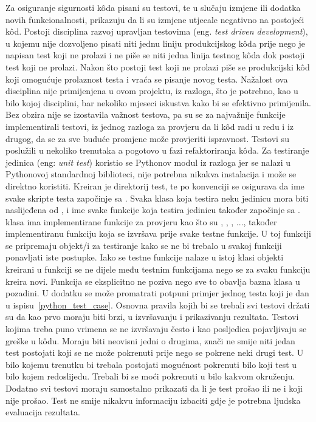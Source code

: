 Za osiguranje sigurnosti k\^oda pisani su testovi, te u slučaju izmjene ili dodatka novih funkcionalnosti, prikazuju da li su izmjene utjecale negativno na postojeći k\^od. Postoji disciplina razvoj upravljan testovima (eng. \textit{test driven development}), u kojemu nije dozvoljeno pisati niti jednu liniju produkcijskog k\^oda prije nego je napisan test koji ne prolazi i ne piše se niti jedna linija testnog k\^oda dok postoji test koji ne prolazi. Nakon što postoji test koji ne prolazi piše se produkcijski k\^od koji omogućuje prolaznost testa i vraća se pisanje novog testa. Nažalost ova disciplina nije primijenjena u ovom projektu, iz razloga, što je potrebno, kao u bilo kojoj disciplini, bar nekoliko mjeseci iskustva kako bi se efektivno primijenila. Bez obzira nije se izostavila važnost testova, pa su se za najvažnije funkcije implementirali testovi, iz jednog razloga za provjeru da li k\^od radi u redu i iz drugog, da se za sve buduće promjene može provjeriti ispravnost. Testovi su poslužili u nekoliko trenutaka a pogotovo u fazi refaktoriranja k\^oda. Za testiranje jedinica (eng: \textit{unit test}) koristio se Pythonov modul  iz razloga jer se nalazi u Pythonovoj standardnoj biblioteci, nije potrebna nikakva instalacija i može se direktno koristiti. Kreiran je direktorij test, te po konvenciji se osigurava da ime svake skripte testa započinje sa . Svaka klasa koja testira neku jedinicu mora biti naslijeđena od , i ime svake funkcije koja testira jedinicu također započinje sa .  klasa ima implementirane funkcije za provjeru kao što su , , , ..., također implementiranu funkciju  koja se izvršava prije svake testne funkcije. U toj funkciji se pripremaju objekt/i za testiranje kako se ne bi trebalo u svakoj funkciji ponavljati iste postupke. Iako se testne funkcije nalaze u istoj klasi objekti kreirani u  funkciji se ne dijele među testnim funkcijama nego se za svaku funkciju kreira novi. Funkcija  se eksplicitno ne poziva nego sve to obavlja bazna klasa  u pozadini. U dodatku se može promatrati potpuni primjer jednog testa koji je dan u ispisu~\ref{python_test_case}. Osnovna pravila kojih bi se trebali svi testovi držati su da kao prvo moraju biti brzi, u izvršavanju i prikazivanju rezultata. Testovi kojima treba puno vrimena se ne izvršavaju često i kao posljedica pojavljivaju se greške u k\^odu. Moraju biti neovisni jedni o drugima, znači ne smije niti jedan test postojati koji se ne može pokrenuti prije nego se pokrene neki drugi test. U bilo kojemu trenutku bi trebala postojati mogućnost pokrenuti bilo koji test u bilo kojem redoslijedu. Trebali bi se moći pokrenuti u bilo kakvom okruženju. Dodatno svi testovi moraju samostalno prikazati da li je test prošao ili ne i koji nije prošao. Test ne smije nikakvu informaciju izbaciti gdje je potrebna ljudska evaluacija rezultata.

